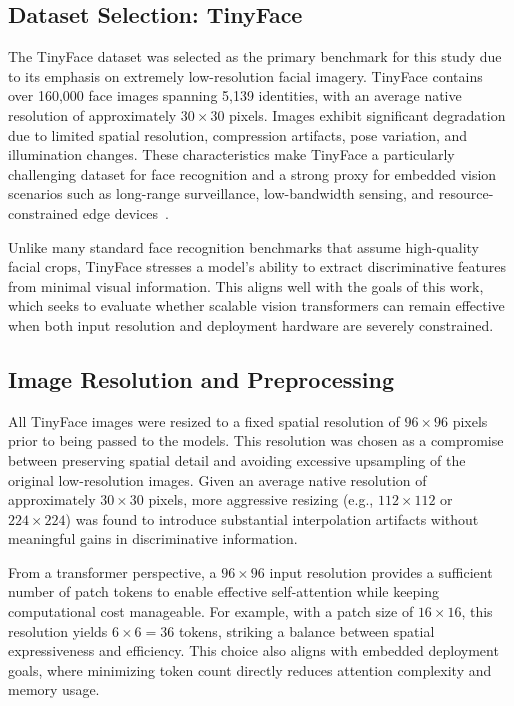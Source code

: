 \documentclass[runningheads,a4paper]{llncs}
\begin{document}
\subsection{Dataset Selection: TinyFace}
The TinyFace dataset was selected as the primary benchmark for this study due to its emphasis on extremely low-resolution facial imagery. TinyFace contains over 160,000 face images spanning 5,139 identities, with an average native resolution of approximately $30\times30$ pixels. Images exhibit significant degradation due to limited spatial resolution, compression artifacts, pose variation, and illumination changes. These characteristics make TinyFace a particularly challenging dataset for face recognition and a strong proxy for embedded vision scenarios such as long-range surveillance, low-bandwidth sensing, and resource-constrained edge devices~\cite{cheng2018lowresface}.

Unlike many standard face recognition benchmarks that assume high-quality facial crops, TinyFace stresses a model’s ability to extract discriminative features from minimal visual information. This aligns well with the goals of this work, which seeks to evaluate whether scalable vision transformers can remain effective when both input resolution and deployment hardware are severely constrained.

\subsection{Image Resolution and Preprocessing}
All TinyFace images were resized to a fixed spatial resolution of $96\times96$ pixels prior to being passed to the models. This resolution was chosen as a compromise between preserving spatial detail and avoiding excessive upsampling of the original low-resolution images. Given an average native resolution of approximately $30\times30$ pixels, more aggressive resizing (e.g., $112\times112$ or $224\times224$) was found to introduce substantial interpolation artifacts without meaningful gains in discriminative information.

From a transformer perspective, a $96\times96$ input resolution provides a sufficient number of patch tokens to enable effective self-attention while keeping computational cost manageable. For example, with a patch size of $16\times16$, this resolution yields $6\times6=36$ tokens, striking a balance between spatial expressiveness and efficiency. This choice also aligns with embedded deployment goals, where minimizing token count directly reduces attention complexity and memory usage.
\end{document}
